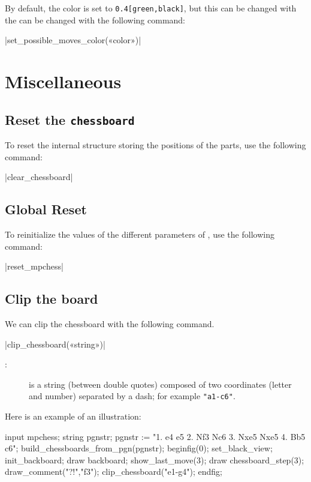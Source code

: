 \documentclass[english]{ltxdoc}
\begin{document}
By default, the color is set to \lstinline+0.4[green,black]+, but this can be changed with the can be changed with the following command:

\commande|set_possible_moves_color(«color»)|\smallskip

\section{Miscellaneous}

\subsection{Reset the \lstinline+chessboard+}

To reset the internal structure storing the positions of the parts,  use
the following command:


\commande|clear_chessboard|\smallskip


\subsection{Global Reset}

To reinitialize the values of the different parameters of \mpchess, use
the following command:

\commande|reset_mpchess|\smallskip


\subsection{Clip the board}

We can clip the chessboard with the following command.

\commande|clip_chessboard(«string»)|\smallskip


\begin{description}
\item[:] is a string (between double quotes)
composed of two coordinates (letter and number) separated by a dash; for example \lstinline+"a1-c6"+.
\end{description}

Here is an example of an illustration:
\begin{ExempleMP}
input mpchess;
string pgnstr;
pgnstr := "1. e4 e5 2. Nf3 Nc6 3. Nxe5 Nxe5 4. Bb5 c6";
build_chessboards_from_pgn(pgnstr);
beginfig(0);
set_black_view;
init_backboard;
draw backboard;
show_last_move(3);
draw chessboard_step(3); %
draw_comment("?!","f3");
clip_chessboard("e1-g4");
endfig;
\end{ExempleMP}
\end{document}
